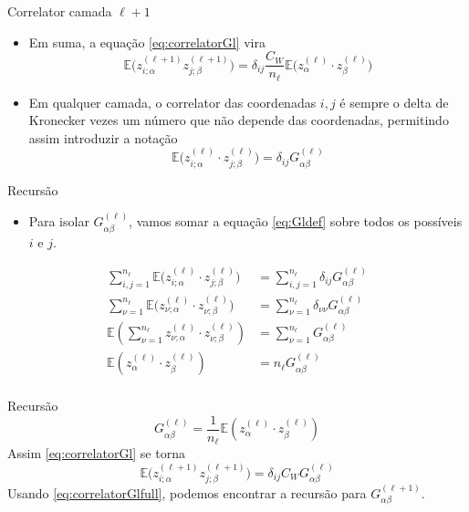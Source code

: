 \documentclass{beamer}
\newcommand{\EE}{\mathbb{E}}
\newcommand{\aaA}{\alpha}
\newcommand{\aaB}{\beta}
\begin{document}
\begin{frame}{Correlator camada $\ell +1$}
	\begin{itemize}
		\item Em suma, a equação \eqref{eq:correlatorGl} vira 
		 \begin{equation*}
			\EE\big(z^{(\ell +1)}_{i;\aaA} z^{(\ell +1)}_{j;\aaB}\big) = \delta_{ij}\frac{C_W}{n_\ell} \EE\big(z^{(\ell)}_{\aaA}\cdot  z^{(\ell)}_{\aaB}\big)\tag{3.11}
		 \end{equation*}
		 \item Em qualquer camada, o correlator das coordenadas $i,j$ é sempre o delta de Kronecker vezes um número que não depende das coordenadas, permitindo assim introduzir a notação 
		 \begin{equation*}\tag{3.12}\label{eq:Gldef}
			\EE\big(z^{(\ell)}_{i;\aaA}\cdot z^{(\ell)}_{j;\aaB}\big) = \delta_{ij} G^{(\ell)}_{\aaA\aaB}  
		 \end{equation*}
	\end{itemize}
\end{frame}

\begin{frame}{Recursão}
	\begin{itemize}
		\item Para isolar $G^{(\ell)}_{\aaA\aaB}$, vamos somar a equação \eqref{eq:Gldef} sobre todos os possíveis $i$ e $j$.
	\end{itemize}
	\begin{align*}
		\sum_{i,j=1}^{n_\ell} \EE\big(z^{(\ell)}_{i;\aaA}\cdot z^{(\ell)}_{j;\aaB}\big) &= \sum_{i,j=1}^{n_\ell} \delta_{ij} G^{(\ell)}_{\aaA\aaB} \\
		\sum_{\nu=1}^{n_\ell} \EE\big(z^{(\ell)}_{\nu;\aaA}\cdot z^{(\ell)}_{\nu;\aaB}\big) &= \sum_{\nu=1}^{n_\ell} \delta_{\nu\nu}G^{(\ell)}_{\aaA\aaB} \\
		\EE\left(\sum_{\nu=1}^{n_\ell}z^{(\ell)}_{\nu;\aaA}\cdot z^{(\ell)}_{\nu;\aaB}\right) &= \sum_{\nu=1}^{n_\ell} G^{(\ell)}_{\aaA\aaB} \\
		\EE(z^{(\ell)}_{\aaA}\cdot z^{(\ell)}_{\aaB}) &= n_\ell G^{(\ell)}_{\aaA\aaB} \\
	\end{align*}
\end{frame}

\begin{frame}{Recursão}
	\begin{equation*}\tag{3.13}\label{eq:Gl}
		G^{(\ell)}_{\aaA\aaB} = \frac{1}{n_\ell}\EE(z^{(\ell)}_{\aaA}\cdot z^{(\ell)}_{\aaB})		
	\end{equation*}
	Assim \eqref{eq:correlatorGl} se torna
	\begin{equation*}\tag{3.11'}\label{eq:correlatorGlfull}
		\EE\big(z^{(\ell +1)}_{i;\aaA} z^{(\ell +1)}_{j;\aaB}\big) = \delta_{ij}C_WG^{(\ell)}_{\aaA\aaB}
	\end{equation*}
	Usando \eqref{eq:correlatorGlfull}, podemos encontrar a recursão para $G^{(\ell+1)}_{\aaA\aaB}$.
\end{frame}
\end{document}
